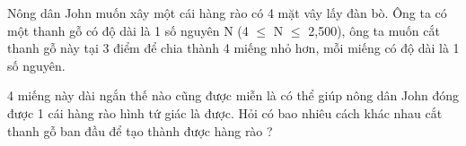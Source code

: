 Nông dân John muốn xây một cái hàng rào có 4 mặt vây lấy đàn bò. Ông ta có một thanh gỗ có độ dài là 1 số nguyên N (4  $\le$  N  $\le$  2,500), ông ta muốn cắt thanh gỗ này tại 3 điểm để chia thành 4 miếng nhỏ  hơn, mỗi miếng có độ dài là 1 số nguyên.  

   4 miếng này dài ngắn thế nào cũng được miễn là có thể giúp nông dân John đóng được 1 cái hàng rào hình tứ giác là được. Hỏi có bao nhiêu cách khác nhau cắt thanh gỗ ban đầu để tạo thành được hàng rào ?
